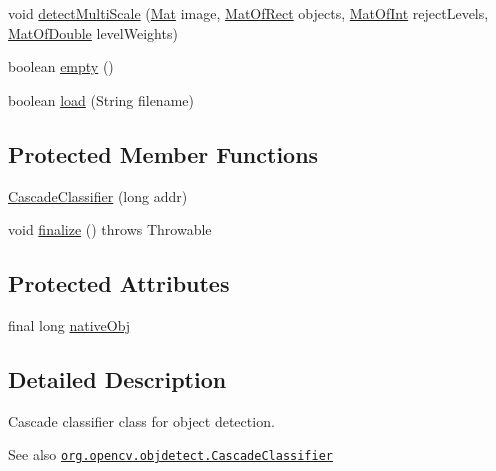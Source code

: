 \begin{DoxyCompactItemize}
\item 
void \mbox{\hyperlink{classorg_1_1opencv_1_1objdetect_1_1_cascade_classifier_a01becad39db73d702e7d673b4fea6238}{detect\+Multi\+Scale}} (\mbox{\hyperlink{classorg_1_1opencv_1_1core_1_1_mat}{Mat}} image, \mbox{\hyperlink{classorg_1_1opencv_1_1core_1_1_mat_of_rect}{Mat\+Of\+Rect}} objects, \mbox{\hyperlink{classorg_1_1opencv_1_1core_1_1_mat_of_int}{Mat\+Of\+Int}} reject\+Levels, \mbox{\hyperlink{classorg_1_1opencv_1_1core_1_1_mat_of_double}{Mat\+Of\+Double}} level\+Weights)
\item 
boolean \mbox{\hyperlink{classorg_1_1opencv_1_1objdetect_1_1_cascade_classifier_ab14fbe3e74cc1c35885fcaa422de69ac}{empty}} ()
\item 
boolean \mbox{\hyperlink{classorg_1_1opencv_1_1objdetect_1_1_cascade_classifier_a5335f53219be85c1192ce1d788504a42}{load}} (String filename)
\end{DoxyCompactItemize}
\subsection*{Protected Member Functions}
\begin{DoxyCompactItemize}
\item 
\mbox{\hyperlink{classorg_1_1opencv_1_1objdetect_1_1_cascade_classifier_a2a930372ce6f7c2576af96ad63fb0d1b}{Cascade\+Classifier}} (long addr)
\item 
void \mbox{\hyperlink{classorg_1_1opencv_1_1objdetect_1_1_cascade_classifier_a3982599d115781cebe9c6489281c2bd4}{finalize}} ()  throws Throwable 
\end{DoxyCompactItemize}
\subsection*{Protected Attributes}
\begin{DoxyCompactItemize}
\item 
final long \mbox{\hyperlink{classorg_1_1opencv_1_1objdetect_1_1_cascade_classifier_a62f0151eeb441d9e90f5f2df9fa29ae9}{native\+Obj}}
\end{DoxyCompactItemize}


\subsection{Detailed Description}
Cascade classifier class for object detection.

\begin{DoxySeeAlso}{See also}
\href{http://docs.opencv.org/modules/objdetect/doc/cascade_classification.html#cascadeclassifier}{\tt org.\+opencv.\+objdetect.\+Cascade\+Classifier} 
\end{DoxySeeAlso}


